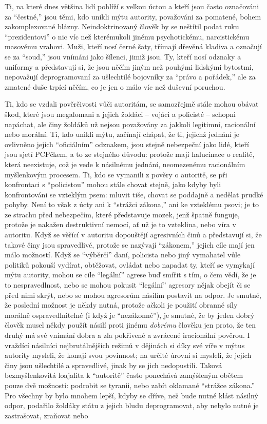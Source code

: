 \documentclass{book}
\begin{document}
Ti, na které dnes většina lidí pohlíží s velkou úctou a kteří jsou často označováni za \enquote{čestné,} jsou těmi, kdo unikli mýtu autority, považováni za pomatené, bohem zakomplexované blázny. Neindoktrinovaný člověk by se neštítil podat ruku \enquote{prezidentovi} o nic víc než kterémukoli jinému psychotickému, narcistickému masovému vrahovi. Muži, kteří nosí černé šaty, třímají dřevěná kladiva a označují se za \enquote{soud,} jsou vnímáni jako šílenci, jimiž jsou. Ty, kteří nosí odznaky a uniformy a představují si, že jsou něčím jiným než pouhými lidskými bytostmi, nepovažují deprogramovaní za ušlechtilé bojovníky za \enquote{právo a pořádek,} ale za zmatené duše trpící něčím, co je jen o málo víc než duševní poruchou.

Ti, kdo se vzdali pověrčivosti vůči autoritám, se samozřejmě stále mohou obávat škod, které jsou megalomani a jejich žoldáci -- vojáci a policisté -- schopni napáchat, ale činy žoldáků už nejsou považovány za jakkoli legitimní, racionální nebo morální. Ti, kdo unikli mýtu, začínají chápat, že ti, jejichž jednání je ovlivněno jejich \enquote{oficiálním} odznakem, jsou stejně nebezpeční jako lidé, kteří jsou sjetí PCPčkem, a to ze stejného důvodu: protože mají halucinace o realitě, která neexistuje, což je vede k násilnému jednání, neomezenému racionálním myšlenkovým procesem. Ti, kdo se vymanili z pověry o autoritě, se při konfrontaci s \enquote{policistou} mohou stále chovat stejně, jako kdyby byli konfrontováni se vzteklým psem: mluvit tiše, chovat se poddajně a nedělat prudké pohyby. Není to však z úcty ani k \enquote{strážci zákona,} ani ke vzteklému psovi; je to ze strachu před nebezpečím, které představuje mozek, jenž špatně funguje, protože je nakažen destruktivní nemocí, ať už je to vzteklina, nebo víra v autoritu. Když se věřící v autoritu dopouštějí agresivních činů a představují si, že takové činy jsou spravedlivé, protože se nazývají \enquote{zákonem,} jejich cíle mají jen málo možností. Když se \enquote{výběrčí} daní, policista nebo jiný vymahatel vůle politiků pokouší vydírat, obtěžovat, ovládat nebo napadat ty, kteří se vymykají mýtu autority, mohou se cíle \enquote{legální} agrese buď smířit s tím, o čem vědí, že je to nespravedlnost, nebo se mohou pokusit \enquote{legální} agresory nějak obejít či se před nimi skrýt, nebo se mohou agresorům násilím postavit na odpor. Je smutné, že poslední možnost je někdy nutná, protože ačkoli je použití obranné síly morálně ospravedlnitelné (i když je \enquote{nezákonné}), je smutné, že by jeden dobrý člověk musel někdy použít násilí proti jinému \emph{dobrému} člověku jen proto, že ten druhý má své vnímání dobra a zla pokřivené a zvrácené iracionální pověrou. I vraždící násilníci nejbrutálnějších režimů v dějinách si díky své víře v mýtus autority mysleli, že konají svou povinnost; na určité úrovni si mysleli, že jejich činy jsou ušlechtilé a spravedlivé, jinak by se jich nedopustili. Taková bezmyšlenkovitá loajalita k \enquote{autoritě} často ponechává zamýšleným obětem pouze dvě možnosti: podrobit se tyranii, nebo zabít oklamané \enquote{strážce zákona.} Pro všechny by bylo mnohem lepší, kdyby se dříve, než bude nutné klást násilný odpor, podařilo žoldáky státu z jejich bludu deprogramovat, aby nebylo nutné je zastrašovat, zraňovat nebo 
\end{document}
